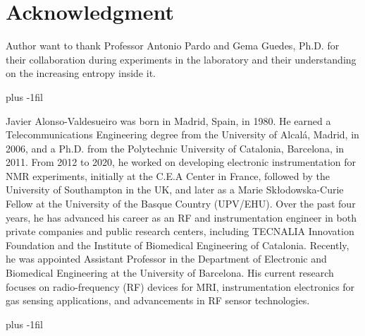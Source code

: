 \documentclass[journal,twoside,web]{ieeecolor}
\begin{document}
\section*{Acknowledgment}
Author want to thank Professor Antonio Pardo and Gema Guedes, Ph.D. for their collaboration during experiments in the laboratory and their understanding on the increasing entropy inside it.



\baselineskip plus -1fil

\begin{IEEEbiography}{Javier Alonso-Valdesueiro}
was born in Madrid, Spain, in 1980. He earned a Telecommunications Engineering degree from the University of Alcalá, Madrid, in 2006, and a Ph.D. from the Polytechnic University of Catalonia, Barcelona, in 2011. From 2012 to 2020, he worked on developing electronic instrumentation for NMR experiments, initially at the C.E.A Center in France, followed by the University of Southampton in the UK, and later as a Marie Skłodowska-Curie Fellow at the University of the Basque Country (UPV/EHU). Over the past four years, he has advanced his career as an RF and instrumentation engineer in both private companies and public research centers, including TECNALIA Innovation Foundation and the Institute of Biomedical Engineering of Catalonia. Recently, he was appointed Assistant Professor in the Department of Electronic and Biomedical Engineering at the University of Barcelona. His current research focuses on radio-frequency (RF) devices for MRI, instrumentation electronics for gas sensing applications, and advancements in RF sensor technologies.
\end{IEEEbiography}
\baselineskip plus -1fil
\end{document}
